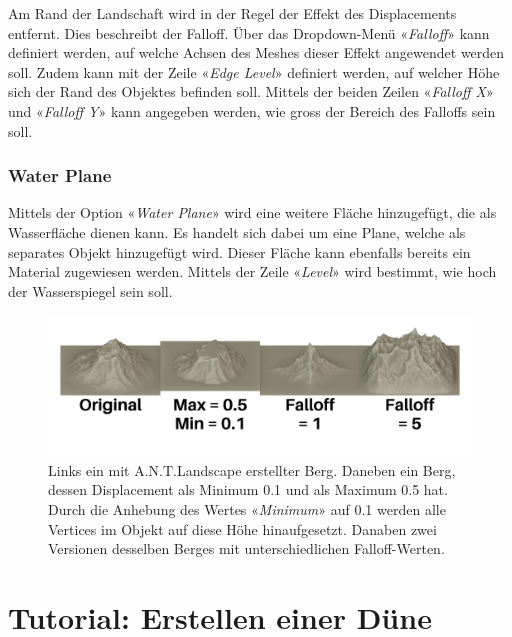 \documentclass[
]{book}
\let\oldmarginnote\marginnote
\renewcommand{\marginnote}[1]{%
  \oldmarginnote{{\footnotesize\selectfont #1}}%
}
\begin{document}
\marginnote{Falloff}

Am Rand der Landschaft wird in der Regel der Effekt des Displacements
entfernt. Dies beschreibt der Falloff. Über das Dropdown-Menü
«\emph{Falloff}» kann definiert werden, auf welche Achsen des Meshes
dieser Effekt angewendet werden soll. Zudem kann mit der Zeile
«\emph{Edge Level}» definiert werden, auf welcher Höhe sich der Rand des
Objektes befinden soll. Mittels der beiden Zeilen «\emph{Falloff X}» und
«\emph{Falloff Y}» kann angegeben werden, wie gross der Bereich des
Falloffs sein soll.

\subsection{Water Plane}\label{water-plane}

\marginnote{Water Plane}

Mittels der Option «\emph{Water Plane}» wird eine weitere Fläche
hinzugefügt, die als Wasserfläche dienen kann. Es handelt sich dabei um
eine Plane, welche als separates Objekt hinzugefügt wird. Dieser Fläche
kann ebenfalls bereits ein Material zugewiesen werden. Mittels der Zeile
«\emph{Level}» wird bestimmt, wie hoch der Wasserspiegel sein soll.

\begin{figure}

\includegraphics{Chapters/Images/Chapter_29/29_3_Landscape_Comparison.png}

\caption{\label{fig-1_3}Links ein mit A.N.T.Landscape erstellter Berg.
Daneben ein Berg, dessen Displacement als Minimum 0.1 und als Maximum
0.5 hat. Durch die Anhebung des Wertes «\emph{Minimum}» auf 0.1 werden
alle Vertices im Objekt auf diese Höhe hinaufgesetzt. Danaben zwei
Versionen desselben Berges mit unterschiedlichen Falloff-Werten.}

\end{figure}%

\chapter{Tutorial: Erstellen einer
Düne}\label{tutorial-erstellen-einer-duxfcne}
\end{document}
